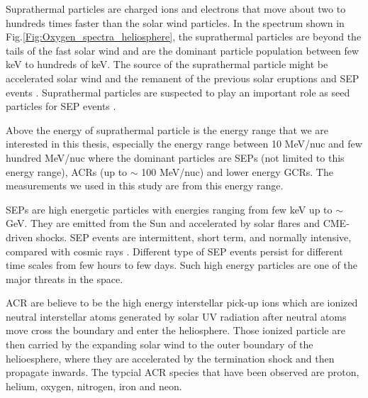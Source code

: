 
Suprathermal particles are charged ions and electrons that move about two to hundreds times faster than the solar wind particles. In the spectrum shown in Fig.\ref{Fig:Oxygen_spectra_heliosphere}, the suprathermal particles are beyond the tails of the fast solar wind and are the dominant particle population between few keV to hundreds of keV. The source of the suprathermal particle might be accelerated solar wind and the remanent of the previous solar eruptions and \ac{SEP} events \citep{Gloeckler1995SSRv}. Suprathermal particles are suspected to play an important role as seed particles for \ac{SEP} events \citep{Kahler2019ApJ}.

Above the energy of suprathermal particle is the energy range that we are interested in this thesis, especially the energy range between 10 MeV/nuc and few hundred MeV/nuc where the dominant particles are \acp{SEP} (not limited to this energy range), \acp{ACR} (up to $\sim$ 100 MeV/nuc) and lower energy \acp{GCR}. The measurements we used in this study are from this energy range.

\acp{SEP} are high energetic particles with energies ranging from few keV up to $\sim$ GeV. They are emitted from the Sun and accelerated by solar flares and \ac{CME}-driven shocks. \acs{SEP} events are intermittent, short term, and normally intensive, compared with cosmic rays \citep{Reames1999}. Different type of \acs{SEP} events persist for different time scales from few hours to few days. Such high energy particles are one of the major threats in the space.

\acs{ACR} are believe to be the high energy interstellar pick-up ions \citep{Giacalone2022SSRv} which are ionized neutral interstellar atoms generated by solar UV radiation after neutral atoms move cross the boundary and enter the heliosphere. Those ionized particle are then carried by the expanding solar wind to the outer boundary of the helioesphere, where they are accelerated by the termination shock and then propagate inwards. The typcial \ac{ACR} species that have been observed are proton, helium, oxygen, nitrogen, iron and neon. 

